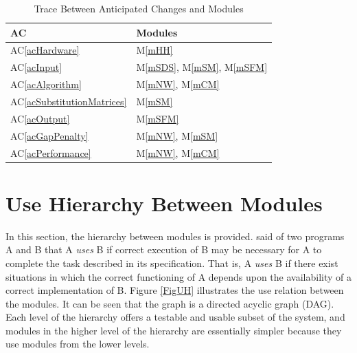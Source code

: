 \documentclass[12pt, titlepage]{article}
\newcommand{\acref}[1]{AC\ref{#1}}
\newcommand{\mref}[1]{M\ref{#1}}
\begin{document}
\begin{table}[H]
  \centering
  \begin{tabular}{p{} p{}}
  \toprule
  \textbf{AC} & \textbf{Modules}\\
  \midrule
  \acref{acHardware} & \mref{mHH} \\
  \acref{acInput} & \mref{mSDS}, \mref{mSM}, \mref{mSFM} \\
  \acref{acAlgorithm} & \mref{mNW}, \mref{mCM} \\
  \acref{acSubstitutionMatrices} & \mref{mSM} \\
  \acref{acOutput} & \mref{mSFM} \\
  \acref{acGapPenalty} & \mref{mNW}, \mref{mSM} \\
  \acref{acPerformance} & \mref{mNW}, \mref{mCM} \\
  \bottomrule
  \end{tabular}
  \caption{Trace Between Anticipated Changes and Modules}
  \label{TblACT}
\end{table}

\section{Use Hierarchy Between Modules} \label{SecUse}

In this section, the hierarchy between modules is
provided. \citet{Parnas1978} said of two programs A and B that A {\em uses} B if
correct execution of B may be necessary for A to complete the task described in
its specification. That is, A {\em uses} B if there exist situations in which
the correct functioning of A depends upon the availability of a correct
implementation of B.  Figure \ref{FigUH} illustrates the use relation between
the modules. It can be seen that the graph is a directed acyclic graph
(DAG). Each level of the hierarchy offers a testable and usable subset of the
system, and modules in the higher level of the hierarchy are essentially simpler
because they use modules from the lower levels.

\end{document}
